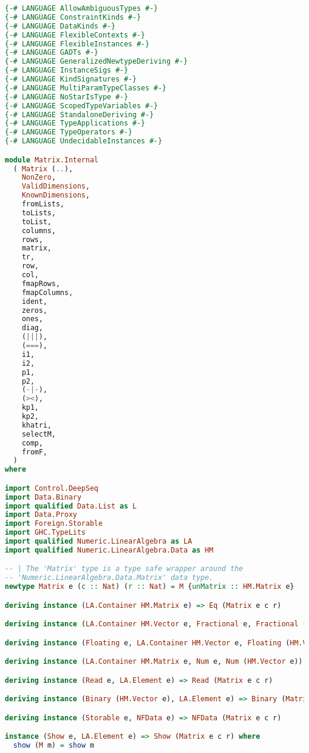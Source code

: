 \documentclass[
  oneside,
  11pt, a4paper,
  footinclude=true,
  headinclude=true,
  cleardoublepage=empty
]{scrbook}
\theoremstyle{definition}
\theoremstyle{definition}
\begin{document}
    \begin{lstlisting}[language=Haskell, caption={Matrix.Internal},captionpos=b]
{-# LANGUAGE AllowAmbiguousTypes #-}
{-# LANGUAGE ConstraintKinds #-}
{-# LANGUAGE DataKinds #-}
{-# LANGUAGE FlexibleContexts #-}
{-# LANGUAGE FlexibleInstances #-}
{-# LANGUAGE GADTs #-}
{-# LANGUAGE GeneralizedNewtypeDeriving #-}
{-# LANGUAGE InstanceSigs #-}
{-# LANGUAGE KindSignatures #-}
{-# LANGUAGE MultiParamTypeClasses #-}
{-# LANGUAGE NoStarIsType #-}
{-# LANGUAGE ScopedTypeVariables #-}
{-# LANGUAGE StandaloneDeriving #-}
{-# LANGUAGE TypeApplications #-}
{-# LANGUAGE TypeOperators #-}
{-# LANGUAGE UndecidableInstances #-}

module Matrix.Internal
  ( Matrix (..),
    NonZero,
    ValidDimensions,
    KnownDimensions,
    fromLists,
    toLists,
    toList,
    columns,
    rows,
    matrix,
    tr,
    row,
    col,
    fmapRows,
    fmapColumns,
    ident,
    zeros,
    ones,
    diag,
    (|||),
    (===),
    i1,
    i2,
    p1,
    p2,
    (-|-),
    (><),
    kp1,
    kp2,
    khatri,
    selectM,
    comp,
    fromF,
  )
where

import Control.DeepSeq
import Data.Binary
import qualified Data.List as L
import Data.Proxy
import Foreign.Storable
import GHC.TypeLits
import qualified Numeric.LinearAlgebra as LA
import qualified Numeric.LinearAlgebra.Data as HM

-- | The 'Matrix' type is a type safe wrapper around the
-- 'Numeric.LinearAlgebra.Data.Matrix' data type.
newtype Matrix e (c :: Nat) (r :: Nat) = M {unMatrix :: HM.Matrix e}

deriving instance (LA.Container HM.Matrix e) => Eq (Matrix e c r)

deriving instance (LA.Container HM.Vector e, Fractional e, Fractional (HM.Vector e), Num (HM.Matrix e)) => Fractional (Matrix e c r)

deriving instance (Floating e, LA.Container HM.Vector e, Floating (HM.Vector e), Fractional (HM.Matrix e)) => Floating (Matrix e c r)

deriving instance (LA.Container HM.Matrix e, Num e, Num (HM.Vector e)) => Num (Matrix e c r)

deriving instance (Read e, LA.Element e) => Read (Matrix e c r)

deriving instance (Binary (HM.Vector e), LA.Element e) => Binary (Matrix e c r)

deriving instance (Storable e, NFData e) => NFData (Matrix e c r)

instance (Show e, LA.Element e) => Show (Matrix e c r) where
  show (M m) = show m


\end{lstlisting}
\end{document}
